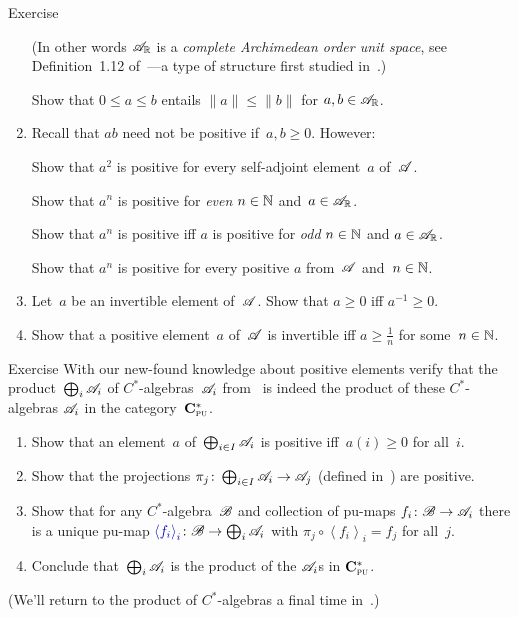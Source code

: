 \documentclass[a]{subfiles}
\begin{document}
\begin{parsec}
\begin{point}{Exercise}
\begin{enumerate}
(In other words
$\mathscr{A}_{\mathbb{R}}$ is a \emph{complete Archimedean order unit space},
see Definition~1.12 of~\cite{alfsen2012}---a 
type of structure first studied in~\cite{kadison1951}.)


Show that $0\leq a \leq b$ entails $\|a\|\leq \|b\|$
for $a,b\in\mathscr{A}_{\mathbb{R}}$.

\item 
Recall that $ab$ need not be positive if~$a,b\geq 0$. However:

Show that $a^2$ is positive for every self-adjoint element~$a$ of~$\mathscr{A}$.

Show that $a^n$ is positive for \emph{even} $n\in \mathbb{N}$ and~$a\in\mathscr{A}_{\mathbb{R}}$.

Show that $a^n$ is positive iff $a$ is positive for \emph{odd} $n\in \mathbb{N}$
and $a\in\mathscr{A}_{\mathbb{R}}$.

Show that $a^n$ is positive
for every positive $a$ from~$\mathscr{A}$ and~$n\in \mathbb{N}$.
\item
Let~$a$ be an invertible element of~$\mathscr{A}$.
Show that $a\geq 0$ iff $a^{-1}\geq 0$.

\item
Show that a positive element~$a$ of~$\mathscr{A}$ is invertible
iff $a\geq \frac{1}{n}$ for some~$n\in \mathbb{N}$.
\end{enumerate}
\end{point}
\end{parsec}
\begin{parsec}%
\begin{point}{Exercise}%
With our new-found
knowledge about positive elements
verify that
the product~$\bigoplus_i \mathscr{A}_i$
of $C^*$-algebras~$\mathscr{A}_i$
from~
is indeed the product of these $C^*$-algebras $\mathscr{A}_i$
in the category~$\mathbf{C}^*_{\text{\textsc{pu}}}$.
\begin{enumerate}
\item
Show
that an element~$a$ of~$\bigoplus_{i\in I} \mathscr{A}_i$
is positive iff~$a(i)\geq 0$ for all~$i$.
\item
Show that the projections $\pi_j\colon \bigoplus_{i \in I}
\mathscr{A}_i \to\mathscr{A}_j$
(defined in~)
are positive.
\item
Show that for any $C^*$-algebra~$\mathscr{B}$
and collection
of pu-maps $f_i\colon \mathscr{B}\to\mathscr{A}_i$
there is a unique pu-map
$\Define{\left<f_i\right>_i}\colon
\scrB\to\bigoplus_{i}\scrA_i$
with $\pi_j\circ \left<f_i\right>_i = f_j$
for all~$j$.
\item
Conclude that~$\bigoplus_i \mathscr{A}_i$
is
the product of the $\mathscr{A}_i$s
in $\mathbf{C}^*_{\text{\textsc{pu}}}$.
\end{enumerate}
(We'll return to the product of $C^*$-algebras
a final time in~.)
\end{point}
\end{parsec}
\end{document}

